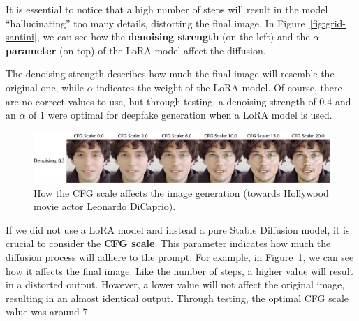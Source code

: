 \documentclass[sn-mathphys,Numbered]{sn-jnl}
\theoremstyle{thmstyleone}%
\theoremstyle{thmstyletwo}%
\theoremstyle{thmstylethree}%
\begin{document}
It is essential to notice that a high number of steps will result in the model ``hallucinating'' too many details, distorting the final image. In Figure~\ref{fig:grid-santini}, we can see how the \textbf{denoising strength} (on the left) and the \textbf{$\alpha$ parameter} (on top) of the LoRA model affect the diffusion. 

The denoising strength describes how much the final image will resemble the original one, while $\alpha$ indicates the weight of the LoRA model. Of course, there are no correct values to use, but through testing, a denoising strength of $0.4$ and an $\alpha$ of $1$ were optimal for deepfake generation when a LoRA model is used. 

\begin{figure}[t]
	\centering
	\includegraphics[width=\textwidth, keepaspectratio]{img/project_img/cfg-examples.png}
	\caption{How the CFG scale affects the image generation (towards Hollywood movie actor Leonardo DiCaprio).}
	\label{fig:cfg-examples}
\end{figure}

If we did not use a LoRA model and instead a pure Stable Diffusion model, 
it is crucial to consider the \textbf{CFG scale}. 
This parameter indicates how much the diffusion process will adhere to the prompt.  For example, in Figure~\ref{fig:cfg-examples}, we can see how it affects the final image.  Like the number of steps, a higher value will result in a distorted output. However, a lower value will not affect the original image, resulting in an almost identical output. Through testing, the optimal CFG scale value was around $7$.
\end{document}
